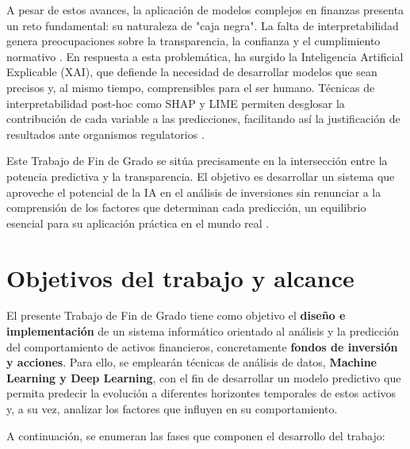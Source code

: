 A pesar de estos avances, la aplicación de modelos complejos en finanzas presenta un reto fundamental: su naturaleza de "caja negra". La falta de interpretabilidad genera preocupaciones sobre la transparencia, la confianza y el cumplimiento normativo \cite{mdpi_blackbox2025}. En respuesta a esta problemática, ha surgido la Inteligencia Artificial Explicable (XAI), que defiende la necesidad de desarrollar modelos que sean precisos y, al mismo tiempo, comprensibles para el ser humano. Técnicas de interpretabilidad post-hoc como SHAP y LIME permiten desglosar la contribución de cada variable a las predicciones, facilitando así la justificación de resultados ante organismos regulatorios \cite{ye2025}.

Este Trabajo de Fin de Grado se sitúa precisamente en la intersección entre la potencia predictiva y la transparencia. El objetivo es desarrollar un sistema que aproveche el potencial de la IA en el análisis de inversiones sin renunciar a la comprensión de los factores que determinan cada predicción, un equilibrio esencial para su aplicación práctica en el mundo real \cite{mdpi_blackbox2025}.

\section{Objetivos del trabajo y alcance}
El presente Trabajo de Fin de Grado tiene como objetivo el \textbf{diseño e implementación} de un sistema informático orientado al análisis y la predicción del comportamiento de activos financieros, concretamente \textbf{fondos de inversión y acciones}. Para ello, se emplearán técnicas de análisis de datos, \textbf{Machine Learning y Deep Learning}, con el fin de desarrollar un modelo predictivo que permita predecir la evolución a diferentes horizontes temporales de estos activos y, a su vez, analizar los factores que influyen en su comportamiento.

A continuación, se enumeran las fases que componen el desarrollo del trabajo:

